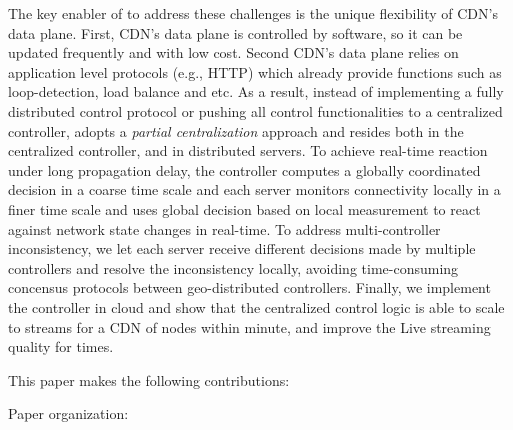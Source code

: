 The key enabler of \SDCDN to address these challenges is the unique flexibility of CDN's data plane. First, CDN's data plane is controlled by software, so it can be updated frequently and with low cost. Second CDN's data plane relies on application level protocols (e.g., HTTP) which already provide functions such as loop-detection, load balance and etc. 
As a result, instead of implementing a fully distributed control
protocol or pushing all control functionalities to a centralized controller, \SDCDN adopts a {\it partial centralization} approach and
resides both in the centralized controller, and in distributed servers. To achieve real-time reaction under long propagation delay, the controller computes a globally coordinated decision in a coarse time scale and each server monitors connectivity locally in a finer time scale and uses global decision based on local measurement to react against network state changes in real-time. To address multi-controller inconsistency, we let each server receive different decisions made by multiple controllers and resolve the inconsistency locally, avoiding time-consuming concensus protocols between geo-distributed controllers. 
Finally, we implement the controller in cloud and show that the centralized control logic is able to scale to \fillme streams for a CDN of \fillme nodes within \fillme minute, and improve the Live streaming quality for \fillme times.

This paper makes the following contributions:
\begin{packeditemize}
	\item 
\end{packeditemize}

Paper organization: 

\begin{comment}
This paper makes the following contributions:
\begin{itemize}
\item Performance and cost-effectiveness: We present a system
that enables a joint optimization with a network-wide view in
Internet content distribution.
Our decision plane utilizes a novel algorithm for content
distribution that outperforms distributed algorithms while
minimizing the cost.
\item Scalability: Our system scales to a large number of nodes
($\sim$ 10,000) and live channels even under a high churn rate.
\item Fault-tolerance: The system provides fault-tolerance of
the DE with multiple DEs, and effectively addresses consistency
issues.
\end{comment}
